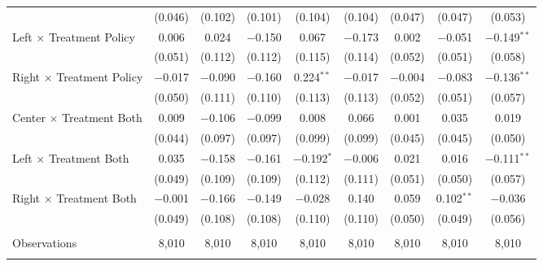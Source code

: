 \begin{tabular}{@{\extracolsep{5pt}}lcccccccc}
  & (0.046) & (0.102) & (0.101) & (0.104) & (0.104) & (0.047) & (0.047) & (0.053) \\ 
 Left $\times$ Treatment Policy & 0.006 & 0.024 & $-$0.150 & 0.067 & $-$0.173 & 0.002 & $-$0.051 & $-$0.149$^{**}$ \\ 
  & (0.051) & (0.112) & (0.112) & (0.115) & (0.114) & (0.052) & (0.051) & (0.058) \\ 
 Right $\times$ Treatment Policy & $-$0.017 & $-$0.090 & $-$0.160 & 0.224$^{**}$ & $-$0.017 & $-$0.004 & $-$0.083 & $-$0.136$^{**}$ \\ 
  & (0.050) & (0.111) & (0.110) & (0.113) & (0.113) & (0.052) & (0.051) & (0.057) \\ 
 Center $\times$ Treatment Both & 0.009 & $-$0.106 & $-$0.099 & 0.008 & 0.066 & 0.001 & 0.035 & 0.019 \\ 
  & (0.044) & (0.097) & (0.097) & (0.099) & (0.099) & (0.045) & (0.045) & (0.050) \\ 
 Left $\times$ Treatment Both & 0.035 & $-$0.158 & $-$0.161 & $-$0.192$^{*}$ & $-$0.006 & 0.021 & 0.016 & $-$0.111$^{**}$ \\ 
  & (0.049) & (0.109) & (0.109) & (0.112) & (0.111) & (0.051) & (0.050) & (0.057) \\ 
 Right $\times$ Treatment Both & $-$0.001 & $-$0.166 & $-$0.149 & $-$0.028 & 0.140 & 0.059 & 0.102$^{**}$ & $-$0.036 \\ 
  & (0.049) & (0.108) & (0.108) & (0.110) & (0.110) & (0.050) & (0.049) & (0.056) \\ 
\hline \\[-1.8ex] 

Observations & 8,010 & 8,010 & 8,010 & 8,010 & 8,010 & 8,010 & 8,010 & 8,010 \\ 
\hline 
\hline \\[-1.8ex] 
\end{tabular} 